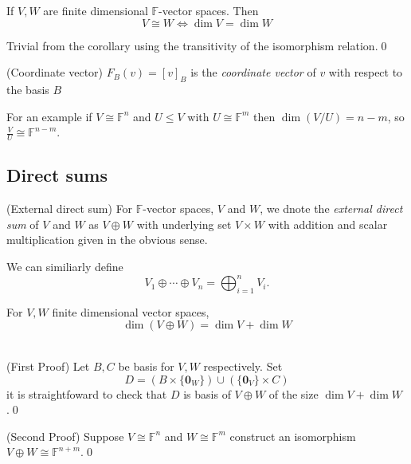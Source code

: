 \documentclass{article}
\newcommand{\F}{\mathbb{F}}
\begin{document}
  \begin{corollary}
    If $ V,W $ are finite dimensional $ \F $-vector spaces. Then
    \[
      V\cong W\iff \dim V=\dim W
    \]
  \end{corollary}
  \pf Trivial from the corollary using the transitivity of the isomorphism relation.\qed
\begin{definition}
	(Coordinate vector) $ F_B(v)=[v]_B $ is the \textit{coordinate vector} of $ v $ with respect to the basis $ B $
\end{definition}
For an example if $ V\cong \F^n $ and $ U\le V $ with $ U\cong \F^m $ then $ \dim(V/U)=n-m $, so $ \frac VU\cong \F^{n-m} $.
\subsection{Direct sums}
\begin{definition}
	(External direct sum) For $ \F $-vector spaces, $ V $ and $ W $, we dnote the \textit{external direct sum} of $ V $ and $ W $ as $ V\oplus W $ with underlying set $ V\times W $ with addition and scalar multiplication given in the obvious sense.
\end{definition}
We can similiarly define
\[
	V_1\oplus \cdots \oplus V_n=\bigoplus_{i=1}^nV_i.
\]
\begin{lemma}
  For $ V,W $ finite dimensional vector spaces,
  \[
    \dim(V\oplus W)=\dim V+\dim W
  \]
\end{lemma}
\pf\\(First Proof) Let $ B,C $ be basis for $ V,W $ respectively. Set
\[
	D=(B\times\{\mathbf 0_W\})\cup (\{\mathbf 0_V\}\times C)
\]
it is straightfoward to check that $ D $ is basis of $ V\oplus W $ of the size $ \dim V + \dim W $.\qed\par
(Second Proof) Suppose $ V\cong \F^n $ and $ W\cong \F^m $ construct an isomorphism $ V\oplus W\cong\F^{n+m} $.\qed
\end{document}
